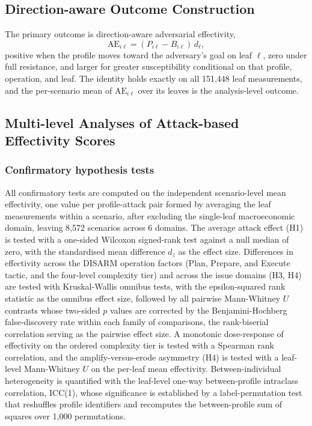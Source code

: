 \documentclass[11pt,a4paper]{article}
\begin{document}
\subsection{Direction-aware Outcome Construction}

The primary outcome is direction-aware adversarial effectivity,
\begin{equation}
\mathrm{AE}_{i\ell} = (P_{i\ell}-B_{i\ell})\,d_\ell ,
\end{equation}
positive when the profile moves toward the adversary's goal on leaf $\ell$, zero under full
resistance, and larger for greater susceptibility conditional on that profile, operation, and
leaf. The identity holds exactly on all 151,448 leaf measurements, and the per-scenario mean of
$\mathrm{AE}_{i\ell}$ over its leaves is the analysis-level outcome.

\subsection{Multi-level Analyses of Attack-based Effectivity Scores}

\subsubsection{Confirmatory hypothesis tests}

All confirmatory tests are computed on the independent scenario-level mean effectivity, one value
per profile-attack pair formed by averaging the leaf measurements within a scenario, after
excluding the single-leaf macroeconomic domain, leaving 8,572 scenarios across 6 domains. The
average attack effect (H1) is tested with a one-sided Wilcoxon signed-rank test against a null
median of zero, with the standardised mean difference $d_z$ as the effect size. Differences in
effectivity across the DISARM operation factors (Plan, Prepare, and Execute tactic, and the
four-level complexity tier) and across the issue domains (H3, H4) are tested with Kruskal-Wallis
omnibus tests, with the epsilon-squared rank statistic as the omnibus effect size, followed by
all pairwise Mann-Whitney $U$ contrasts whose two-sided $p$ values are corrected by the
Benjamini-Hochberg false-discovery rate within each family of comparisons, the rank-biserial
correlation serving as the pairwise effect size. A monotonic dose-response of effectivity on the
ordered complexity tier is tested with a Spearman rank correlation, and the amplify-versus-erode
asymmetry (H4) is tested with a leaf-level Mann-Whitney $U$ on the per-leaf mean effectivity.
Between-individual heterogeneity is quantified with the leaf-level one-way between-profile
intraclass correlation, ICC(1), whose significance is established by a label-permutation test that
reshuffles profile identifiers and recomputes the between-profile sum of squares over 1,000
permutations.
\end{document}
